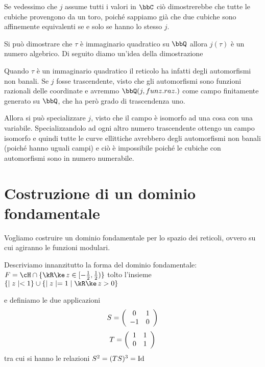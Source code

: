 \begin{osservazione}
  Se vedessimo che $j$ assume tutti i valori in $\bbC$ ciò dimostrerebbe
  che tutte le cubiche provengono da un toro, poiché sappiamo già che
  due cubiche sono affinemente equivalenti se e solo se hanno lo stesso $j$.
\end{osservazione}

\begin{divagazione}
  Si può dimostrare che $\tau$ è immaginario quadratico su $\bbQ$ allora
  $j(\tau)$ è un numero algebrico. Di seguito diamo un'idea della dimostrazione

  Quando $\tau$ è un immaginario quadratico il reticolo ha infatti degli
  automorfismi non banali. Se $j$ fosse trascendente, visto che gli
  automorfismi sono funzioni razionali delle coordinate e avremmo
  $\bbQ(j, funz.raz.)$ come campo finitamente generato su $\bbQ$, che ha
  però grado di trascendenza uno.

  Allora si può specializzare $j$, visto che il campo è isomorfo ad una
  cosa con una variabile. Specializzandolo ad ogni altro numero
  trascendente ottengo un campo isomorfo e quindi tutte le curve
  ellittiche avrebbero degli automorfismi non banali (poiché hanno
  uguali campi) e ciò è impossibile poiché le cubiche con automorfismi
  sono in numero numerabile.
\end{divagazione}

\section{Costruzione di un dominio fondamentale}

Vogliamo costruire un dominio fondamentale per lo spazio dei reticoli,
ovvero su cui agiranno le funzioni modulari.

Descriviamo innanzitutto la forma del dominio fondamentale:
$ F = \cH \cap \{ \Re z \in [ -\frac{1}{2}, \frac{1}{2} ) \} $
tolto l'insieme $\{ \abs{z} < 1 \} \cup \{ \abs{z} = 1 \mid \Re z > 0 \}$

e definiamo le due applicazioni
$$ S = \left({\begin{array}{cc} 0 & 1 \\ -1 & 0 \\ \end{array}}\right) $$
$$ T = \left({\begin{array}{cc} 1 & 1 \\ 0 & 1 \\ \end{array}}\right) $$
tra cui si hanno le relazioni $S^2 = (TS)^3 = \text{Id}$

